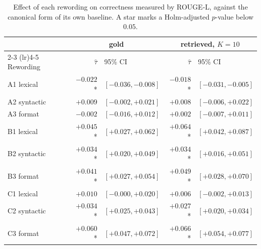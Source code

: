\documentclass[12pt,a4paper,oneside]{scrreprt}
\begin{document}
\begin{table}[htbp]
\centering
\caption{Effect of each rewording on correctness measured by ROUGE-L, against the canonical form of its own baseline. A star marks a Holm-adjusted $p$-value below $0.05$.}
\label{tab:rouge}
\begin{tabular}{lrlrl}
\toprule
 & \multicolumn{2}{c}{gold} & \multicolumn{2}{c}{retrieved, $K = 10$} \\
\cmidrule(lr){2-3} \cmidrule(lr){4-5}
Rewording & $\hat{\tau}$ & 95\% CI & $\hat{\tau}$ & 95\% CI \\
\midrule
A1 lexical   & $-0.022$* & $[-0.036, -0.008]$ & $-0.018$* & $[-0.031, -0.005]$ \\
A2 syntactic & $+0.009$\phantom{*} & $[-0.002, +0.021]$ & $+0.008$\phantom{*} & $[-0.006, +0.022]$ \\
A3 format    & $-0.002$\phantom{*} & $[-0.016, +0.012]$ & $+0.002$\phantom{*} & $[-0.007, +0.011]$ \\
B1 lexical   & $+0.045$* & $[+0.027, +0.062]$ & $+0.064$* & $[+0.042, +0.087]$ \\
B2 syntactic & $+0.034$* & $[+0.020, +0.049]$ & $+0.034$* & $[+0.016, +0.051]$ \\
B3 format    & $+0.041$* & $[+0.027, +0.054]$ & $+0.049$* & $[+0.028, +0.070]$ \\
C1 lexical   & $+0.010$\phantom{*} & $[-0.000, +0.020]$ & $+0.006$\phantom{*} & $[-0.002, +0.013]$ \\
C2 syntactic & $+0.034$* & $[+0.025, +0.043]$ & $+0.027$* & $[+0.020, +0.034]$ \\
C3 format    & $+0.060$* & $[+0.047, +0.072]$ & $+0.066$* & $[+0.054, +0.077]$ \\
\bottomrule
\end{tabular}
\end{table}
\end{document}
